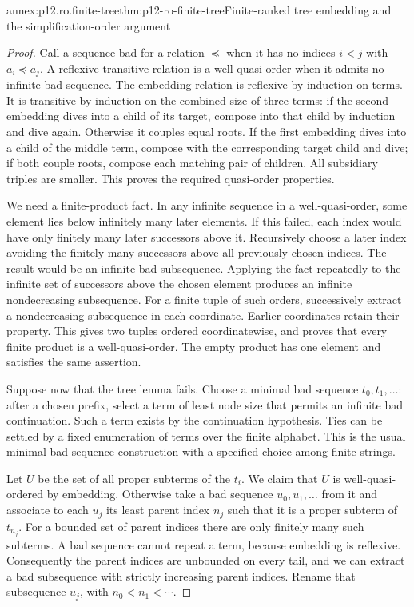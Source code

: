 \begin{annexitem}{annex:p12.ro.finite-tree}{thm:p12-ro-finite-tree}{Finite-ranked tree embedding and the simplification-order argument}
\begin{proof}
Call a sequence bad for a relation \(\preceq\) when it has no
indices \(i<j\) with \(a_i\preceq a_j\). A reflexive transitive
relation is a well-quasi-order when it admits no infinite bad sequence.
The embedding relation is reflexive by induction on terms. It is
transitive by induction on the combined size of three terms: if the
second embedding dives into a child of its target, compose into that
child by induction and dive again. Otherwise it couples equal roots.
If the first embedding dives into a child of the middle term, compose
with the corresponding target child and dive; if both couple roots,
compose each matching pair of children. All subsidiary triples are
smaller. This proves the required quasi-order properties.

We need a finite-product fact. In any infinite sequence in a
well-quasi-order, some element lies below infinitely many later
elements. If this failed, each index would have only finitely many
later successors above it. Recursively choose a later index avoiding
the finitely many successors above all previously chosen indices.
The result would be an infinite bad subsequence. Applying the fact
repeatedly to the infinite set of successors above the chosen element
produces an infinite nondecreasing subsequence. For a finite tuple
of such orders, successively extract a nondecreasing subsequence in
each coordinate. Earlier coordinates retain their property. This
gives two tuples ordered coordinatewise, and proves that every finite
product is a well-quasi-order. The empty product has one element and
satisfies the same assertion.

Suppose now that the tree lemma fails. Choose a minimal bad sequence
\(t_0,t_1,\ldots\): after a chosen prefix, select a term of least
node size that permits an infinite bad continuation. Such a term
exists by the continuation hypothesis. Ties can be settled by a fixed
enumeration of terms over the finite alphabet. This is the usual
minimal-bad-sequence construction with a specified choice among
finite strings.

Let \(U\) be the set of all proper subterms of the \(t_i\).
We claim that \(U\) is well-quasi-ordered by embedding. Otherwise
take a bad sequence \(u_0,u_1,\ldots\) from it and associate to
each \(u_j\) its least parent index \(n_j\) such that it is a
proper subterm of \(t_{n_j}\). For a bounded set of parent indices
there are only finitely many such subterms. A bad sequence cannot
repeat a term, because embedding is reflexive. Consequently the
parent indices are unbounded on every tail, and we can extract a bad
subsequence with strictly increasing parent indices. Rename that
subsequence \(u_j\), with \(n_0<n_1<\cdots\).


\end{proof}
\end{annexitem}
